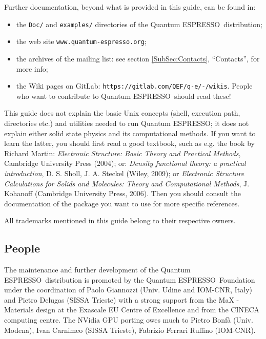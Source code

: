 \documentclass[12pt,a4paper]{article}
\def\qe{{\sc Quantum ESPRESSO}}
\begin{document}
Further documentation, beyond what is provided in this guide, can be found in:
\begin{itemize}
\item the \texttt{Doc/} and \texttt{examples/} directories
   of the \qe\ distribution;
\item the web site \texttt{www.quantum-espresso.org};
\item the archives of the  mailing list:
   see section \ref{SubSec:Contacts}, ``Contacts'', for more info;
\item the Wiki pages on GitLab:
   \texttt{https://gitlab.com/QEF/q-e/-/wikis}.
   People who want to contribute to \qe\ should read these!
\end{itemize}
This guide does not explain the basic Unix concepts (shell, execution
path, directories etc.) and utilities needed to run \qe; it does not
explain either solid state physics and its computational methods.
If you want to learn the latter, you should first read a good textbook,
such as e.g. the book by Richard Martin:
{\em Electronic Structure: Basic Theory and Practical Methods},
Cambridge University Press (2004); or:
{\em Density functional theory: a practical introduction},
D. S. Sholl, J. A. Steckel (Wiley, 2009); or
{\em Electronic Structure Calculations for Solids and Molecules:
Theory and Computational Methods},
J. Kohanoff (Cambridge University Press, 2006). Then you should consult
the documentation of the package you want to use for more specific references.

All trademarks mentioned in this guide belong to their respective owners.

\subsection{People}

The maintenance and further development of the \qe\ distribution
is promoted by the \qe\ Foundation under the coordination of
Paolo Giannozzi (Univ. Udine and IOM-CNR, Italy) and Pietro Delugas
(SISSA Trieste) with a strong support from the MaX - Materials design
at the Exascale EU Centre of Excellence and from the CINECA computing 
centre. The NVidia GPU porting owes much to Pietro Bonf\`a (Univ. Modena), 
Ivan Carnimeo (SISSA Trieste), Fabrizio Ferrari Ruffino (IOM-CNR).
\end{document}
